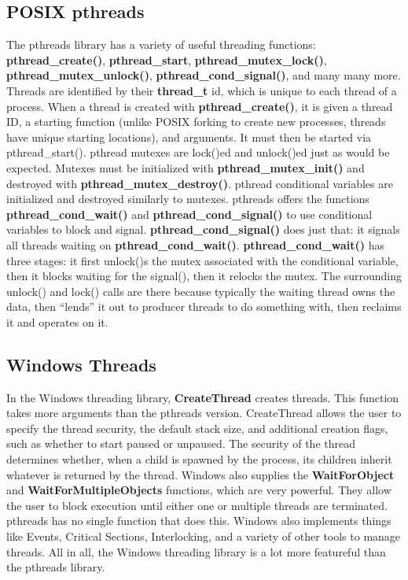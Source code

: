 \documentclass[11pt]{article}
\begin{document}
\subsection{POSIX pthreads}
The pthreads library has a variety of useful threading functions: \textbf{pthread\_create()}, \textbf{pthread\_start}, \textbf{pthread\_mutex\_lock()}, \textbf{pthread\_mutex\_unlock()}, \textbf{pthread\_cond\_signal()}, and many many more. Threads are identified by their \textbf{thread\_t} id, which is unique to each thread of a process. When a thread is created with \textbf{pthread\_create()}, it is given a thread ID, a starting function (unlike POSIX forking to create new processes, threads have unique starting locations), and arguments. It must then be started via pthread\_start(). pthread mutexes are lock()ed and unlock()ed just as would be expected. Mutexes must be initialized with \textbf{pthread\_mutex\_init()} and destroyed with \textbf{pthread\_mutex\_destroy()}. pthread conditional variables are initialized and destroyed similarly to mutexes. pthreads offers the functions \textbf{pthread\_cond\_wait()} and \textbf{pthread\_cond\_signal()} to use conditional variables to block and signal. \textbf{pthread\_cond\_signal()} does just that: it signals all threads waiting on \textbf{pthread\_cond\_wait()}. \textbf{pthread\_cond\_wait()} has three stages: it first unlock()s the mutex associated with the conditional variable, then it blocks waiting for the signal(), then it relocks the mutex. The surrounding unlock() and lock() calls are there because typically the waiting thread owns the data, then ``lends'' it out to producer threads to do something with, then reclaims it and operates on it.\\

\subsection{Windows Threads}
In the Windows threading library, \textbf{CreateThread} creates threads. This function takes more arguments than the pthreads version. CreateThread allows the user to specify the thread security, the default stack size, and additional creation flags, such as whether to start paused or unpaused. The security of the thread determines whether, when a child is spawned by the process, its children inherit whatever is returned by the thread. Windows also supplies the \textbf{WaitForObject} and \textbf{WaitForMultipleObjects} functions, which are very powerful. They allow the user to block execution until either one or multiple threads are terminated. pthreads has no single function that does this. Windows also implements things like Events, Critical Sections, Interlocking, and a variety of other tools to manage threads. All in all, the Windows threading library is a lot more featureful than the pthreads library. \\
\end{document}
